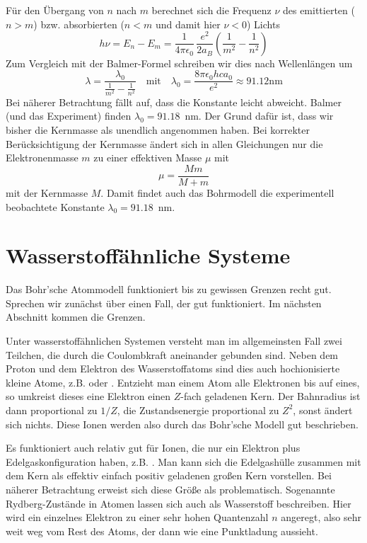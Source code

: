 Für den Übergang von $n$ nach $m$ berechnet sich die Frequenz $\nu$ des emittierten ($n > m$) bzw. absorbierten ($n < m$ und damit hier $\nu < 0$) Lichts
\begin{equation}
    h \nu = E_n - E_m  =   \frac{1}{4 \pi \epsilon_0}  \, \frac{e^2}{2 a_B}  \left( \frac{1}{m^2} - \frac{1}{n^2} \right) 
\end{equation}
Zum Vergleich mit der Balmer-Formel schreiben wir dies nach Wellenlängen um
\begin{equation}
    \lambda = \frac{\lambda_0}{\frac{1}{m^2} - \frac{1}{n^2}} \quad \text{mit} \quad \lambda_0 = \frac{8 \pi \epsilon_0 h c a_0}{e^2} \approx 91.12 \text{nm}
\end{equation}
Bei näherer Betrachtung fällt auf, dass die Konstante leicht abweicht. Balmer (und das Experiment) finden $\lambda_0 = 91.18$~nm. Der Grund dafür ist, dass wir bisher die Kernmasse als unendlich angenommen haben. Bei korrekter Berücksichtigung der Kernmasse ändert sich in allen Gleichungen nur die Elektronenmasse $m$ zu einer effektiven Masse $\mu$ mit
\begin{equation}
    \mu = \frac{M m }{M + m}
\end{equation} 
mit der Kernmasse $M$. Damit findet auch das Bohrmodell die experimentell beobachtete Konstante $\lambda_0 = 91.18$~nm.




\section{Wasserstoffähnliche Systeme}

Das Bohr'sche Atommodell funktioniert bis zu gewissen Grenzen recht gut. Sprechen wir zunächst über einen Fall, der gut funktioniert. Im nächsten Abschnitt kommen die Grenzen.

Unter wasserstoffähnlichen Systemen versteht man im allgemeinsten Fall zwei Teilchen, die durch die Coulombkraft aneinander gebunden sind. Neben dem Proton und dem Elektron des Wasserstoffatoms sind dies auch hochionisierte kleine Atome, z.B.  oder . Entzieht man einem Atom alle Elektronen bis auf eines, so umkreist dieses eine Elektron einen $Z$-fach geladenen Kern. Der Bahnradius ist dann proportional zu $1/Z$, die Zustandsenergie proportional zu $Z^2$, sonst ändert sich nichts. Diese Ionen werden also durch das Bohr'sche Modell gut beschrieben. 

Es funktioniert auch relativ gut für Ionen, die nur ein Elektron plus Edelgaskonfiguration haben, z.B. . Man kann sich die Edelgashülle zusammen mit dem Kern als effektiv einfach positiv geladenen großen Kern vorstellen. Bei näherer Betrachtung erweist sich diese Größe als problematisch. Sogenannte Rydberg-Zustände in Atomen lassen sich auch als Wasserstoff beschreiben. Hier wird ein einzelnes Elektron zu einer sehr hohen Quantenzahl $n$ angeregt, also sehr weit weg vom Rest des Atoms, der dann wie eine Punktladung aussieht. 

